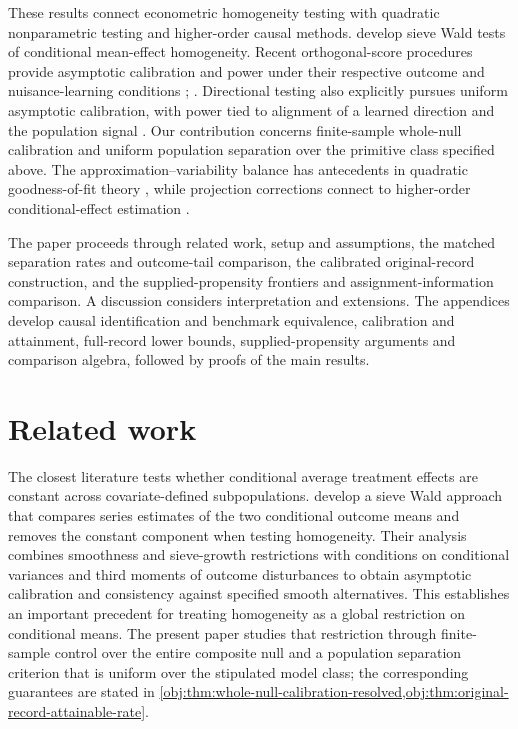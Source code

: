 \documentclass[11pt]{article}
\begin{document}
These results connect econometric homogeneity testing with quadratic nonparametric testing and higher-order causal methods. \citet[Section III]{CrumpHotzImbensMitnik2008Homogeneity} develop sieve Wald tests of conditional mean-effect homogeneity. Recent orthogonal-score procedures provide asymptotic calibration and power under their respective outcome and nuisance-learning conditions \citep[Assumptions 1--5, Theorems 3.1--3.3 and 4.1]{LuSong2026OrthogonalICM}; \citep[Assumptions 3.3--3.4, Proposition 3.1]{LapentaStrittmatterVergara2026Omnibus}. Directional testing also explicitly pursues uniform asymptotic calibration, with power tied to alignment of a learned direction and the population signal \citep[Theorem 1, Corollaries 1--2]{DhawanGuoShah2026Directional}. Our contribution concerns finite-sample whole-null calibration and uniform population separation over the primitive class specified above. The approximation--variability balance has antecedents in quadratic goodness-of-fit theory \citep[Sections 2--4, Theorems 1--2]{IngsterSapatinas2009GoodnessOfFit}, while projection corrections connect to higher-order conditional-effect estimation \citep[Sections 3--4]{KennedyBalakrishnanRobinsWasserman2024MinimaxCATE}.



The paper proceeds through related work, setup and assumptions, the matched separation rates and outcome-tail comparison, the calibrated original-record construction, and the supplied-propensity frontiers and assignment-information comparison. A discussion considers interpretation and extensions. The appendices develop causal identification and benchmark equivalence, calibration and attainment, full-record lower bounds, supplied-propensity arguments and comparison algebra, followed by proofs of the main results.


\section{Related work}

The closest literature tests whether conditional average treatment effects are constant across covariate-defined subpopulations. \citet[Section III]{CrumpHotzImbensMitnik2008Homogeneity} develop a sieve Wald approach that compares series estimates of the two conditional outcome means and removes the constant component when testing homogeneity. Their analysis combines smoothness and sieve-growth restrictions with conditions on conditional variances and third moments of outcome disturbances to obtain asymptotic calibration and consistency against specified smooth alternatives. This establishes an important precedent for treating homogeneity as a global restriction on conditional means. The present paper studies that restriction through finite-sample control over the entire composite null and a population separation criterion that is uniform over the stipulated model class; the corresponding guarantees are stated in \cref{obj:thm:whole-null-calibration-resolved,obj:thm:original-record-attainable-rate}.
\end{document}
